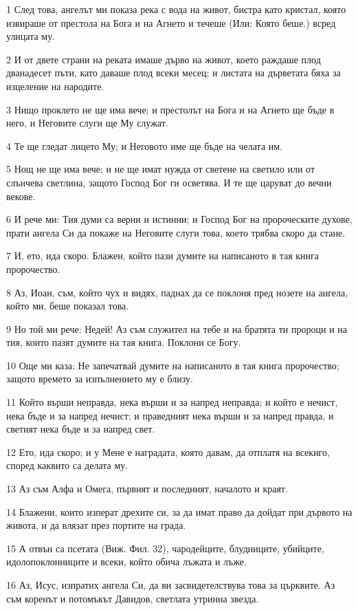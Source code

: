 \par 1 След това, ангелът ми показа река с вода на живот, бистра като кристал, която извираше от престола на Бога и на Агнето и течеше (Или: Която беше.) всред улицата му.
\par 2 И от двете страни на реката имаше дърво на живот, което раждаше плод дванадесет пъти, като даваше плод всеки месец; и листата на дърветата бяха за изцеление на народите.
\par 3 Нищо проклето не ще има вече; и престолът на Бога и на Агнето ще бъде в него, и Неговите слуги ще Му служат.
\par 4 Те ще гледат лицето Му; и Неговото име ще бъде на челата им.
\par 5 Нощ не ще има вече; и не ще имат нужда от светене на светило или от слънчева светлина, защото Господ Бог ги осветява. И те ще царуват до вечни векове.
\par 6 И рече ми: Тия думи са верни и истинни; и Господ Бог на пророческите духове, прати ангела Си да покаже на Неговите слуги това, което трябва скоро да стане.
\par 7 И, ето, ида скоро. Блажен, който пази думите на написаното в тая книга пророчество.
\par 8 Аз, Иоан, съм, който чух и видях, паднах да се поклоня пред нозете на ангела, който ми, беше показал това.
\par 9 Но той ми рече: Недей! Аз съм служител на тебе и на братята ти пророци и на тия, които пазят думите на тая книга. Поклони се Богу.
\par 10 Още ми каза: Не запечатвай думите на написаното в тая книга пророчество; защото времето за изпълнението му е близу.
\par 11 Който върши неправда, нека върши и за напред неправда; и който е нечист, нека бъде и за напред нечист; и праведният нека върши и за напред правда, и светият нека бъде и за напред свет.
\par 12 Ето, ида скоро; и у Мене е наградата, която давам, да отплатя на всекиго, според каквито са делата му.
\par 13 Аз съм Алфа и Омега, първият и последният, началото и краят.
\par 14 Блажени, които изперат дрехите си, за да имат право да дойдат при дървото на живота, и да влязат през портите на града.
\par 15 А отвън са псетата (Виж. Фил. 32), чародейците, блудниците, убийците, идолопоклонниците и всеки, който обича лъжата и лъже.
\par 16 Аз, Исус, изпратих ангела Си, да ви засвидетелствува това за църквите. Аз съм коренът и потомъкът Давидов, светлата утринна звезда.
